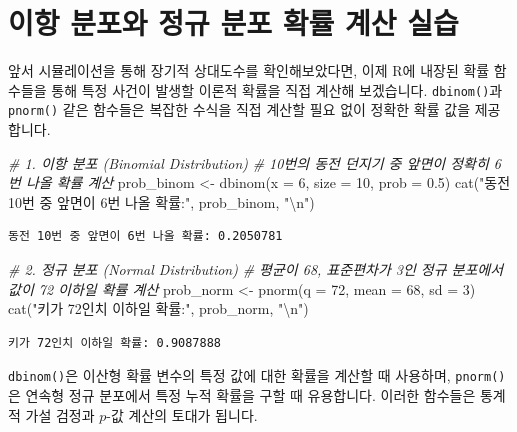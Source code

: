 \documentclass[
]{scrbook}
\newenvironment{Shaded}{}{}
\newcommand{\AttributeTok}[1]{\textcolor[rgb]{0.49,0.56,0.16}{#1}}
\newcommand{\CommentTok}[1]{\textcolor[rgb]{0.38,0.63,0.69}{\textit{#1}}}
\newcommand{\DecValTok}[1]{\textcolor[rgb]{0.25,0.63,0.44}{#1}}
\newcommand{\FloatTok}[1]{\textcolor[rgb]{0.25,0.63,0.44}{#1}}
\newcommand{\FunctionTok}[1]{\textcolor[rgb]{0.02,0.16,0.49}{#1}}
\newcommand{\NormalTok}[1]{#1}
\newcommand{\OtherTok}[1]{\textcolor[rgb]{0.00,0.44,0.13}{#1}}
\newcommand{\SpecialCharTok}[1]{\textcolor[rgb]{0.25,0.44,0.63}{#1}}
\newcommand{\StringTok}[1]{\textcolor[rgb]{0.25,0.44,0.63}{#1}}
\begin{document}
\section{이항 분포와 정규 분포 확률 계산
실습}\label{uxc774uxd56d-uxbd84uxd3ecuxc640-uxc815uxaddc-uxbd84uxd3ec-uxd655uxb960-uxacc4uxc0b0-uxc2e4uxc2b5}

앞서 시뮬레이션을 통해 장기적 상대도수를 확인해보았다면, 이제 R에 내장된
확률 함수들을 통해 특정 사건이 발생할 이론적 확률을 직접 계산해
보겠습니다. \texttt{dbinom()}과 \texttt{pnorm()} 같은 함수들은 복잡한
수식을 직접 계산할 필요 없이 정확한 확률 값을 제공합니다.

\begin{Shaded}
\begin{Highlighting}[]
\CommentTok{\# 1. 이항 분포 (Binomial Distribution)}
\CommentTok{\# 10번의 동전 던지기 중 앞면이 정확히 6번 나올 확률 계산}
\NormalTok{prob\_binom }\OtherTok{\textless{}{-}} \FunctionTok{dbinom}\NormalTok{(}\AttributeTok{x =} \DecValTok{6}\NormalTok{, }\AttributeTok{size =} \DecValTok{10}\NormalTok{, }\AttributeTok{prob =} \FloatTok{0.5}\NormalTok{)}
\FunctionTok{cat}\NormalTok{(}\StringTok{"동전 10번 중 앞면이 6번 나올 확률:"}\NormalTok{, prob\_binom, }\StringTok{"}\SpecialCharTok{\textbackslash{}n}\StringTok{"}\NormalTok{)}
\end{Highlighting}
\end{Shaded}

\begin{verbatim}
동전 10번 중 앞면이 6번 나올 확률: 0.2050781 
\end{verbatim}

\begin{Shaded}
\begin{Highlighting}[]
\CommentTok{\# 2. 정규 분포 (Normal Distribution)}
\CommentTok{\# 평균이 68, 표준편차가 3인 정규 분포에서 값이 72 이하일 확률 계산}
\NormalTok{prob\_norm }\OtherTok{\textless{}{-}} \FunctionTok{pnorm}\NormalTok{(}\AttributeTok{q =} \DecValTok{72}\NormalTok{, }\AttributeTok{mean =} \DecValTok{68}\NormalTok{, }\AttributeTok{sd =} \DecValTok{3}\NormalTok{)}
\FunctionTok{cat}\NormalTok{(}\StringTok{"키가 72인치 이하일 확률:"}\NormalTok{, prob\_norm, }\StringTok{"}\SpecialCharTok{\textbackslash{}n}\StringTok{"}\NormalTok{)}
\end{Highlighting}
\end{Shaded}

\begin{verbatim}
키가 72인치 이하일 확률: 0.9087888 
\end{verbatim}

\texttt{dbinom()}은 이산형 확률 변수의 특정 값에 대한 확률을 계산할 때
사용하며, \texttt{pnorm()}은 연속형 정규 분포에서 특정 누적 확률을 구할
때 유용합니다. 이러한 함수들은 통계적 가설 검정과 \(p\)-값 계산의 토대가
됩니다.


\backmatter
\end{document}

